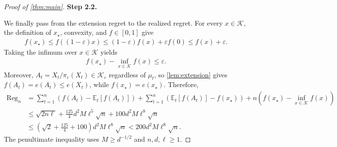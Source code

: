 \documentclass[11pt]{article}
\newcommand{\proofstepinline}[1]{%
    {\sffamily\bfseries\color{blue!55!black}Step #1.}\enspace
}
\newcommand{\E}{\mathbb E}
\newcommand{\K}{\mathcal K}
\newcommand{\1}{\mathbf 1}
\newcommand{\eps}{\varepsilon}
\begin{document}
\begin{proof}[Proof of \cref{thm:main}]
    \proofstepinline{2.2}
    We finally pass from the extension regret to the realized regret.
    For every $x\in\K$, the definition of $x_\star$, convexity, and
    $f\in[0,1]$ give
    \begin{align}
        f(x_\star)
        \leq f((1-\eps)x)
        \leq(1-\eps)f(x)+\eps f(0)
        \leq f(x)+\eps.
    \end{align}
    Taking the infimum over $x\in\K$ yields
    \begin{align}
        f(x_\star)-\inf_{x\in\K}f(x)\leq\eps.
        \label{eq:shrink-comparator}
    \end{align}
    Moreover, $A_t=X_t/\pi_\eps(X_t)\in\K_\eps$ regardless of $\mu_t$,
    so \cref{lem:extension} gives $f(A_t)=e(A_t)\leq e(X_t)$, while
    $f(x_\star)=e(x_\star)$. Therefore,
    \begin{align}
        \operatorname{Reg}_n
         & =\sum_{t=1}^n\left(f(A_t)-\E_t[f(A_t)]\right)
        +\sum_{t=1}^n\left(\E_t[f(A_t)]-f(x_\star)\right)
        +n\left(f(x_\star)-\inf_{x\in\K}f(x)\right)
        \nonumber                                        \\
         & \leq\sqrt{2n\ell}
        +\frac{125}{4}d^2M\ell^5\sqrt n
        +100d^2M\ell^8\sqrt n
        \nonumber                                        \\
         & \leq\left(\sqrt2+\frac{125}{4}+100\right)
        d^2M\ell^8\sqrt n
        <200d^2M\ell^8\sqrt n.
    \end{align}
    The penultimate inequality uses $M\geq d^{-1/2}$ and $n,d,\ell\geq1$.
\end{proof}
\end{document}
